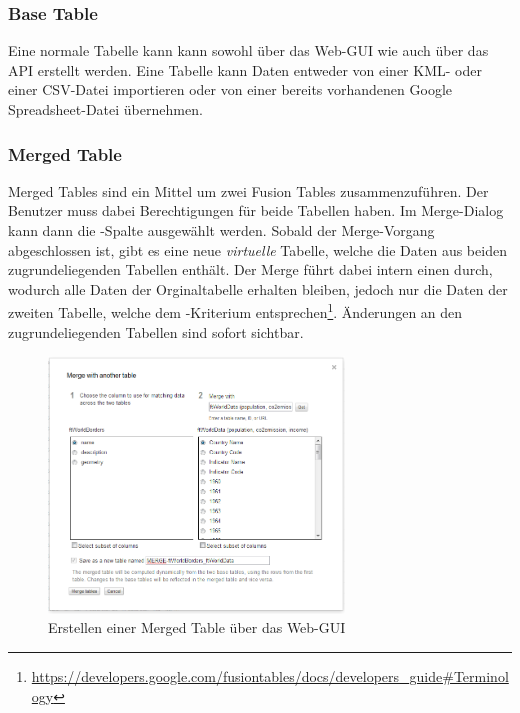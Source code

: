\subsubsection{Base Table}
Eine normale Tabelle kann kann sowohl über das Web-GUI wie auch über das \gls{API} erstellt werden. Eine Tabelle kann Daten entweder von einer \gls{KML}- oder einer \gls{CSV}-Datei importieren oder von einer bereits vorhandenen Google Spreadsheet-Datei übernehmen.

\subsubsection{Merged Table}
\label{merge-table}
Merged Tables sind ein Mittel um zwei Fusion Tables zusammenzuführen. Der Benutzer muss dabei Berechtigungen für beide Tabellen haben. Im \gls{Merge}-Dialog kann dann die -Spalte ausgewählt werden. Sobald der \gls{Merge}-Vorgang abgeschlossen ist, gibt es eine neue \emph{virtuelle} Tabelle, welche die Daten aus beiden zugrundeliegenden Tabellen enthält. Der \gls{Merge} führt dabei intern einen  durch, wodurch alle Daten der Orginaltabelle erhalten bleiben, jedoch nur die Daten der zweiten Tabelle, welche dem -Kriterium entsprechen\footnote{ \url{https://developers.google.com/fusiontables/docs/developers_guide\#Terminology}}. Änderungen an den zugrundeliegenden Tabellen sind sofort sichtbar.

\begin{figure}[!ht]
	\centering
	\includegraphics[width=0.7\textwidth]{images/usecase1-worlddata/documentation/worlddata-merge2}
	\caption{Erstellen einer Merged Table über das Web-GUI}
	\label{create-merge-table}
\end{figure}

